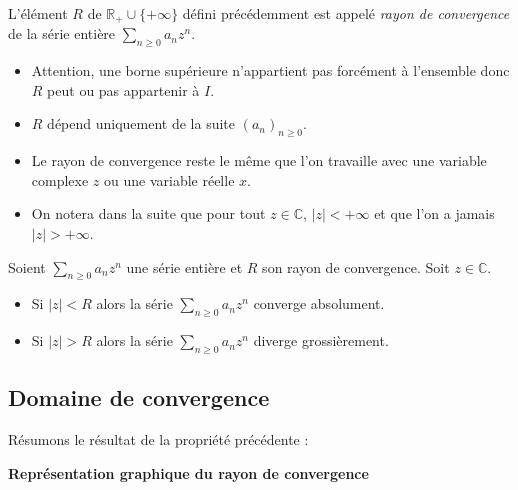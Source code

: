 \documentclass[french,11pt,twoside]{VcCours}
\begin{document}
\begin{Definition}{} L'élément $R$ de $\mathbb{R}_+ \cup \lbrace + \infty \rbrace$ défini précédemment est appelé \emph{rayon de convergence} de la série entière $\sum_{n \geq 0} a_n z^n$.
\end{Definition}

\begin{Remarques}{}
\begin{itemize}
\item Attention, une borne supérieure n'appartient pas forcément à l'ensemble donc $R$ peut ou pas appartenir à $I$.
\item $R$ dépend uniquement de la suite $(a_n)_{n \geq 0}$.
\item Le rayon de convergence reste le même que l'on travaille avec une variable complexe $z$ ou une variable réelle $x$.
\item On notera dans la suite que pour tout $z \in \mathbb{C}$, $ \vert z \vert < + \infty$ et que l'on a jamais $\vert z \vert > + \infty$.
\end{itemize}
\end{Remarques}

\begin{Proposition}{} Soient $\sum_{n \geq 0} a_n z^n$ une série entière et $R$ son rayon de convergence. Soit $z \in \mathbb{C}$.

\begin{itemize}
\item Si $\vert z \vert < R$ alors la série $\sum_{n \geq 0} a_n z^n$ converge absolument.
\item Si $\vert z \vert > R$ alors la série $\sum_{n \geq 0} a_n z^n$ diverge grossièrement.
\end{itemize}
\end{Proposition}

\begin{Demonstration}{}
\vspace*{ 5.5cm}
\end{Demonstration}

\subsection{Domaine de convergence}
Résumons le résultat de la propriété précédente : 

\begin{center}
\textbf{Représentation graphique du rayon de convergence}
\end{center}

\vspace*{5.5cm}
\end{document}
